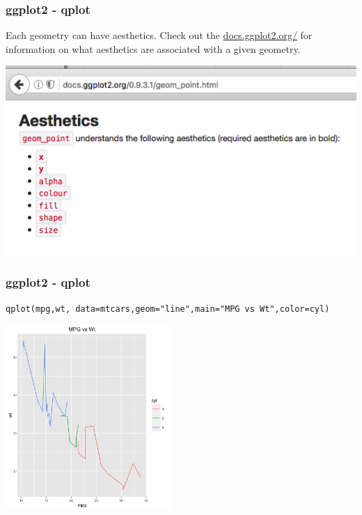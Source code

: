 \documentclass{beamer}
\begin{document}
%
\begin{frame}[fragile]
\frametitle{ggplot2 - qplot}Each geometry can have aesthetics. Check out the \url{docs.ggplot2.org/} for information on what aesthetics are associated with a given geometry.

\scriptsize
\begin{center}
\includegraphics{../IMG/geom_ref.png}
\end{center}
\end{frame}



\begin{frame}[fragile]
\frametitle{ggplot2 - qplot}
\scriptsize
\begin{verbatim}
qplot(mpg,wt, data=mtcars,geom="line",main="MPG vs Wt",color=cyl)
\end{verbatim}

\scriptsize
\begin{center}
\includegraphics[height=7cm]{../IMG/qplot_line_color.png}
\end{center}
\end{frame}


\end{document}
